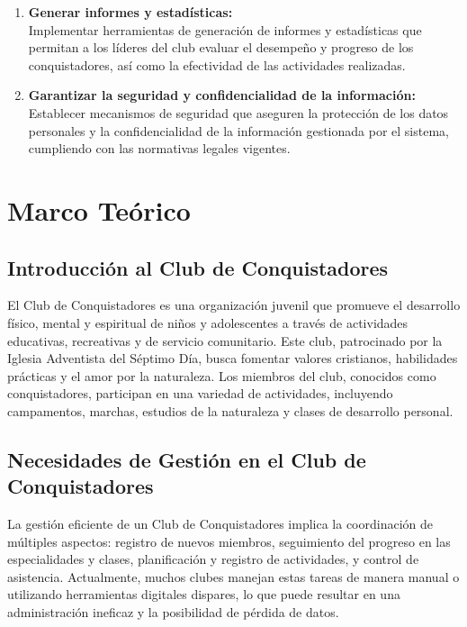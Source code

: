 \documentclass[stu, 12pt, letterpaper, donotrepeattitle, floatsintext, natbib]{apa7}
\begin{document}
\begin{enumerate}
    \item\textbf{Generar informes y estad\'isticas:}\\Implementar herramientas de generaci\'on de informes y estad\'isticas que permitan a los l\'ideres del club evaluar el desempe\~{n}o y progreso de los conquistadores, as\'i como la efectividad de las actividades realizadas.
    \item\textbf{Garantizar la seguridad y confidencialidad de la informaci\'on:}\\Establecer mecanismos de seguridad que aseguren la protecci\'on de los datos personales y la confidencialidad de la informaci\'on gestionada por el sistema, cumpliendo con las normativas legales vigentes.
\end{enumerate}

\section{Marco Te\'orico}

\subsection{Introducci\'on al Club de Conquistadores}
El Club de Conquistadores es una organizaci\'on juvenil que promueve el
desarrollo f\'isico, mental y espiritual de ni\~{n}os y adolescentes a trav\'es
de actividades educativas, recreativas y de servicio comunitario. Este club,
patrocinado por la Iglesia Adventista del S\'eptimo D\'ia, busca fomentar
valores cristianos, habilidades pr\'acticas y el amor por la naturaleza. Los
miembros del club, conocidos como conquistadores, participan en una variedad de
actividades, incluyendo campamentos, marchas, estudios de la naturaleza y
clases de desarrollo personal.

\subsection{Necesidades de Gesti\'on en el Club de Conquistadores}
La gesti\'on eficiente de un Club de Conquistadores implica la coordinaci\'on
de m\'ultiples aspectos: registro de nuevos miembros, seguimiento del progreso
en las especialidades y clases, planificaci\'on y registro de actividades, y
control de asistencia. Actualmente, muchos clubes manejan estas tareas de
manera manual o utilizando herramientas digitales dispares, lo que puede
resultar en una administraci\'on ineficaz y la posibilidad de p\'erdida de
datos.
\end{document}

